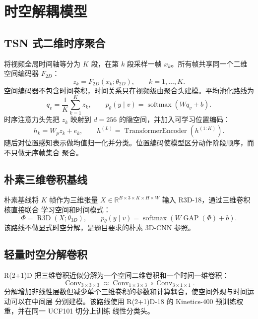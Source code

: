 \section{时空解耦模型}

\subsection{TSN 式二维时序聚合}

将视频全局时间轴等分为 $K$ 段，在第 $k$ 段采样一帧 $x_k$。所有帧共享同一个二维空间编码器
$F_{2D}$：
\begin{equation}
  z_k=F_{2D}(x_k;\theta_{2D}),\qquad k=1,\ldots,K.
  \label{eq:tsn_feature}
\end{equation}
空间编码器不包含时间卷积，时间关系只在视频级由聚合头建模\cite{tsn}。平均池化路线为
\begin{equation}
  q_v=\frac{1}{K}\sum_{k=1}^{K}z_k,\qquad
  p_\theta(y\mid v)=\operatorname{softmax}(Wq_v+b).
  \label{eq:tsn_mean}
\end{equation}
时序注意力头先把 $z_k$ 映射到 $d=256$ 的隐空间，并加入可学习位置编码：
\begin{equation}
  h_k=W_p z_k+e_k,\qquad
  h^{(L)}=\operatorname{TransformerEncoder}(h^{(1:K)}).
  \label{eq:temporal_attention}
\end{equation}
随后对位置感知表示做均值归一化并分类。位置编码使模型区分动作阶段顺序，而不只做无序帧集合
聚合。

\subsection{朴素三维卷积基线}

朴素基线将 $K$ 帧作为三维张量\cite{i3d}
$X\in\mathbb{R}^{B\times3\times K\times H\times W}$ 输入 R3D-18，通过三维卷积核直接联合
学习空间和时间模式：
\begin{equation}
  \Phi=\operatorname{R3D}(X;\theta_{3D}),\qquad
  p_\theta(y\mid v)=\operatorname{softmax}(W\operatorname{GAP}(\Phi)+b).
  \label{eq:r3d}
\end{equation}
该路线不做显式时空分解，是题目要求的朴素 3D-CNN 参照。

\subsection{轻量时空分解卷积}

R(2+1)D 把三维卷积近似分解为一个空间二维卷积和一个时间一维卷积\cite{r21d}：
\begin{equation}
  \operatorname{Conv}_{3\times3\times3}
  \approx
  \operatorname{Conv}_{1\times3\times3}
  \circ
  \operatorname{Conv}_{3\times1\times1}.
  \label{eq:r21d}
\end{equation}
分解增加非线性层数但减少单个三维卷积的参数和计算耦合，使空间外观与时间运动可以在中间层
分别建模。该路线使用 R(2+1)D-18 的 Kinetics-400 预训练权重，并在同一 UCF101 切分上训练
线性分类头。

